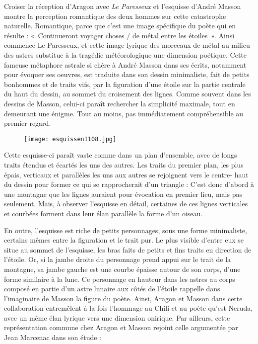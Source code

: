 Croiser la réception d’Aragon avec \emph{Le Paresseux} et l’esquisse d’André Masson montre la perception romantique des deux hommes sur cette catastrophe naturelle. Romantique, parce que c’est une image spécifique du poète qui en résulte : « Continueront voyager choses / de métal entre les étoiles ». Ainsi commence Le Paresseux, et cette image lyrique des morceaux de métal au milieu des astres substitue à la tragédie météorologique une dimension poétique. Cette fameuse métaphore astrale si chère à André Masson dans ses écrits, notamment pour évoquer ses oeuvres, est traduite dans son dessin minimaliste, fait de petits bonhommes et de traits vifs, par la figuration d’une étoile sur la partie centrale du haut du dessin, au sommet du croisement des lignes. Comme souvent dans les dessins de Masson, celui-ci paraît rechercher la simplicité maximale, tout en demeurant une énigme. Tout au moins, pas immédiatement compréhensible au premier regard. 

\begin{figure}[H]
   \centering
   \texttt{[image: esquissen1108.jpg]}
	\caption{\cite{pabloneruda}}\label{fig:MassonNeruda}
\end{figure}

	Cette esquisse-ci paraît vaste comme dans un plan d’ensemble, avec de longs traits étendus et écartés les uns des autres. Les traits du premier plan, les plus épais, verticaux et parallèles les uns aux autres se rejoignent vers le centre- haut du dessin pour former ce qui se rapprocherait d’un triangle : C’est donc d’abord à une montagne que les lignes auraient pour évocation en premier lieu, mais pas seulement. Mais, à observer l’esquisse en détail, certaines de ces lignes verticales et courbées forment dans leur élan parallèle la forme d’un oiseau. 


En outre, l’esquisse est riche de petits personnages, sous une forme minimaliste, certains mêmes entre la figuration et le trait pur. Le plus visible d’entre eux se situe au sommet de l’esquisse, les bras faits de petits et fins traits en direction de l’étoile. Or, si la jambe droite du personnage prend appui sur le trait de la montagne, sa jambe gauche est une courbe épaisse autour de son corps, d’une forme similaire à la lune. Ce personnage en hauteur dans les astres au corps composé en partie d’un astre lunaire aux côtés de l’étoile rappelle dans l’imaginaire de Masson la figure du poète. Ainsi, Aragon et Masson dans cette collaboration entremêlent à la fois l’hommage au Chili et au poète qu’est Neruda, avec un même élan lyrique vers une dimension onirique. Par ailleurs, cette représentation commune chez Aragon et Masson rejoint celle argumentée par Jean Marcenac dans son étude :

